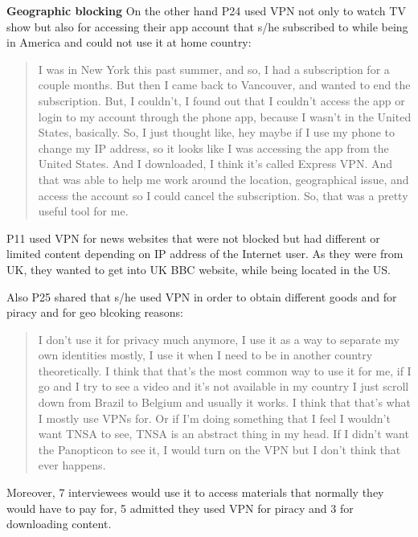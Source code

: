 \textbf{Geographic blocking} On the other hand P24 used VPN not only to watch TV show but also for accessing their app account that s/he subscribed to while being in America and could not use it at home country:
\begin{quote}I was in New York this past summer, and so, I had a subscription for a couple months. But then I came back to Vancouver, and wanted to end the subscription. But, I couldn't, I found out that I couldn't access the app or login to my account through the phone app, because I wasn't in the United States, basically. So, I just thought like, hey maybe if I use my phone to change my IP address, so it looks like I was accessing the app from the United States. And I downloaded, I think it's called Express VPN. And that was able to help me work around the location, geographical issue, and access the account so I could cancel the subscription. So, that was a pretty useful tool for me.\end{quote}


P11 used VPN for news websites that were not blocked but had different or limited content depending on IP address of the Internet user. As they were from UK, they wanted to get into UK BBC website, while being located in the US.

Also P25 shared that s/he used VPN in order to obtain different goods and for piracy and for geo blcoking reasons:
\begin{quote}I don't use it for privacy much anymore, I use it as a way to separate my own identities mostly, I use it when I need to be in another country theoretically. I think that that's the most common way to use it for me, if I go and I try to see a video and it's not available in my country I just scroll down from Brazil to Belgium and usually it works. I think that that's what I mostly use VPNs for. Or if I'm doing something that I feel I wouldn't want TNSA to see, TNSA is an abstract thing in my head. If I didn't want the Panopticon to see it, I would turn on the VPN but I don't think that ever happens.\end{quote}

Moreover, 7 interviewees would use it to access materials that normally they would have to pay for, 5 admitted they used VPN for piracy and 3 for downloading content.

